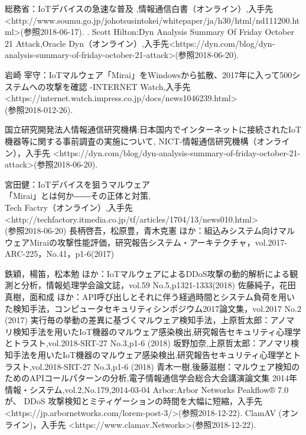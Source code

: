 
\begin{thebibliography}{10}
		総務省：IoTデバイスの急速な普及 ,情報通信白書（オンライン）,入手先\textless http://www.soumu.go.jp/johotsusintokei/whitepaper/ja/h30/html/nd111200.html\textgreater(参照2018-06-17).
   .
       Scott Hilton:Dyn Analysis Summary Of Friday October 21 Attack,Oracle Dyn（オンライン）,入手先\textless https:\slash\slash{}dyn.com\slash{}blog\slash{}dyn-analysis-summary-of-friday-october-21-attack\textgreater (参照2018-06-20).
    
       岩崎 宰守：IoTマルウェア「Mirai」をWindowsから拡散、2017年に入って500システムへの攻撃を確認 -INTERNET Watch,入手先\textless https:\slash\slash{}internet.watch.impress.co.jp\slash{}docs\slash{}news1046239.html\textgreater\\(参照2018-012-26).
    
        国立研究開発法人情報通信研究機構:日本国内でインターネットに接続されたIoT機器等に関する事前調査の実施について, NICT-情報通信研究機構（オンライン），入手先 \textless https:\slash\slash{}dyn.com\slash{}blog\slash{}dyn-analysis-summary-of-friday-october-21-
        attack\textgreater (参照2018-06-20).
        
        宮田健：IoTデバイスを狙うマルウェア\\「Mirai」とは何か――その正体と対策,\\Tech Factry（オンライン）,入手先\textless http:\slash\slash{}techfactory.itmedia.co.jp\slash{}tf\slash{}articles\slash{}1704\slash{}13\slash{}news010.html\textgreater\\(参照2018-06-20)
        長柄啓吾，松原豊，青木克憲 ほか：組込みシステム向けマルウェアMiraiの攻撃性能評価，研究報告システム・アーキテクチャ，vol.2017-ARC-225，No.41，p1-6(2017)
    
        鉄穎，楊笛，松本勉 ほか：IoTマルウェアによるDDoS攻撃の動的解析による観測と分析，情報処理学会論文誌，vol.59 No.5,p1321-1333(2018)
        佐藤純子，花田真樹，面和成 ほか：API呼び出しとそれに伴う経過時間とシステム負荷を用いた検知手法，コンピュータセキュリティシンポジウム2017論文集，vol.2017 No.2 (2017)
        実行毎の挙動の差異に基づくマルウェア検知手法，上原哲太郎：アノマリ検知手法を用いたIoT機器のマルウェア感染検出,研究報告セキュリティ心理学とトラスト,vol.2018-SRT-27 No.3,p1-6 (2018)
        坂野加奈,上原哲太郎：アノマリ検知手法を用いたIoT機器のマルウェア感染検出,研究報告セキュリティ心理学とトラスト,vol.2018-SRT-27 No.3,p1-6 (2018)
         青木一樹,後藤滋樹：マルウェア検知のためのAPIコールパターンの分析,電子情報通信学会総合大会講演論文集 2014年 情報・システム,vol.2,No.179,2014-03-04
         Arbor:Arbor Networks Peakflow® 7.0 が、 DDoS 攻撃検知とミティゲーションの時間を大幅に短縮，入手先 \textless https:\slash\slash{}jp.arbornetworks.com\slash{}lorem-post-3\slash{}\textgreater (参照2018-12-22).
         ClamAV (オンライン)，入手先 \textless https:\slash\slash{}www.clamav.Networks\textgreater(参照2018-12-22).


\end{thebibliography}
